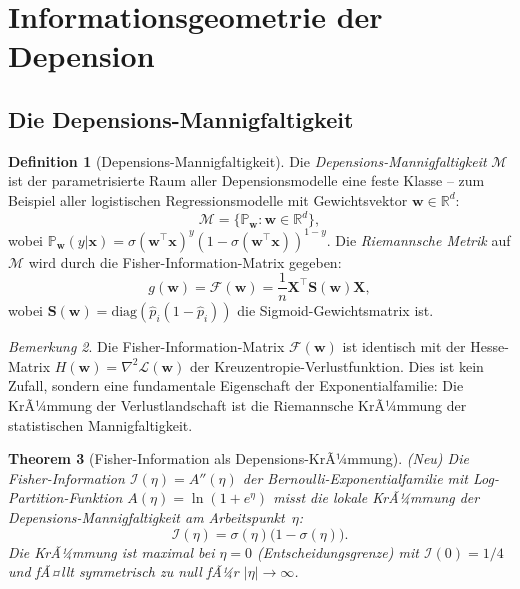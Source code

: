 ﻿\documentclass[12pt, a4paper]{article}
\newtheorem{theorem}{Theorem}[section]
\theoremstyle{definition}
\newtheorem{definition}[theorem]{Definition}
\theoremstyle{remark}
\newtheorem{remark}[theorem]{Bemerkung}
\newcommand{\R}{\mathbb{R}}
\newcommand{\Prob}{\mathbb{P}}
\newcommand{\sigmoid}{\sigma}
\newcommand{\vw}{\bm{w}}
\newcommand{\vx}{\bm{x}}
\newcommand{\vX}{\bm{X}}
\newcommand{\vS}{\bm{S}}
\newcommand{\T}{\top}
\newcommand{\diag}{\mathrm{diag}}
\begin{document}
\section{Informationsgeometrie der Depension}
\label{sec:infogeom}

\subsection{Die Depensions-Mannigfaltigkeit}

\begin{definition}[Depensions-Mannigfaltigkeit]
\label{def:manifold}
Die \emph{Depensions-Mannigfaltigkeit} $\mathcal{M}$ ist der parametrisierte Raum
aller Depensionsmodelle eine feste Klasse -- zum Beispiel aller logistischen
Regressionsmodelle mit Gewichtsvektor $\vw \in \R^d$:
\[
  \mathcal{M} = \bigl\{\Prob_{\vw} : \vw \in \R^d\bigr\},
\]
wobei $\Prob_{\vw}(y|\vx) = \sigmoid(\vw^\T\vx)^y (1-\sigmoid(\vw^\T\vx))^{1-y}$.
Die \emph{Riemannsche Metrik} auf $\mathcal{M}$ wird durch die
Fisher-Information-Matrix gegeben:
\begin{equation}
  g(\vw) = \mathcal{F}(\vw) = \frac{1}{n}\vX^\T\vS(\vw)\vX,
  \label{eq:fisher}
\end{equation}
wobei $\vS(\vw) = \diag(\hat{p}_i(1-\hat{p}_i))$ die Sigmoid-Gewichtsmatrix ist.
\end{definition}

\begin{remark}
Die Fisher-Information-Matrix $\mathcal{F}(\vw)$ ist identisch mit der Hesse-Matrix
$H(\vw) = \nabla^2\mathcal{L}(\vw)$ der Kreuzentropie-Verlustfunktion. Dies ist
kein Zufall, sondern eine fundamentale Eigenschaft der Exponentialfamilie: Die
KrÃ¼mmung der Verlustlandschaft ist die Riemannsche KrÃ¼mmung der statistischen
Mannigfaltigkeit.
\end{remark}

\begin{theorem}[Fisher-Information als Depensions-KrÃ¼mmung]
\label{thm:fisher_kruemmung}
\textup{(Neu)} Die Fisher-Infor\-mation $\mathcal{I}(\eta) = A''(\eta)$ der
Bernoulli-Exponentialfamilie mit Log-Partition-Funktion $A(\eta) = \ln(1+e^\eta)$
misst die lokale KrÃ¼mmung der Depensions-Mann\-ig\-fal\-tig\-keit am Arbeitspunkt~$\eta$:
\begin{equation}
  \mathcal{I}(\eta) = \sigmoid(\eta)\bigl(1-\sigmoid(\eta)\bigr).
  \label{eq:fisher_info}
\end{equation}
Die KrÃ¼mmung ist maximal bei $\eta = 0$ (Entscheidungsgrenze) mit $\mathcal{I}(0) = 1/4$
und fÃ¤llt symmetrisch zu null fÃ¼r $|\eta| \to \infty$.
\end{theorem}
\end{document}
